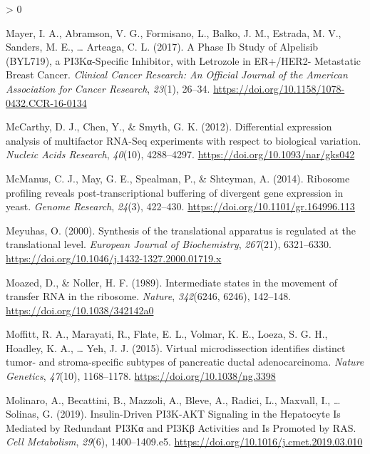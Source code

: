 \documentclass[
  12pt,
  openany]{book}
\newlength{\cslhangindent}
\newenvironment{CSLReferences}[2] %
 {%
  \setlength{\parindent}{0pt}
  \ifodd #1 \everypar{\setlength{\hangindent}{\cslhangindent}}\ignorespaces\fi
  \ifnum #2 > 0
  \setlength{\parskip}{#2\baselineskip}
  \fi
 }%
 {}
\begin{document}
\begin{CSLReferences}{1}{0}
\leavevmode\hypertarget{ref-Mayer2017}{}%
Mayer, I. A., Abramson, V. G., Formisano, L., Balko, J. M., Estrada, M. V., Sanders, M. E., \ldots{} Arteaga, C. L. (2017). A {Phase Ib Study} of {Alpelisib} ({BYL719}), a {PI3Kα}-{Specific Inhibitor}, with {Letrozole} in {ER}+/{HER2}- {Metastatic Breast Cancer}. \emph{Clinical Cancer Research: An Official Journal of the American Association for Cancer Research}, \emph{23}(1), 26--34. \url{https://doi.org/10.1158/1078-0432.CCR-16-0134}

\leavevmode\hypertarget{ref-McCarthy2012}{}%
McCarthy, D. J., Chen, Y., \& Smyth, G. K. (2012). Differential expression analysis of multifactor {RNA}-{Seq} experiments with respect to biological variation. \emph{Nucleic Acids Research}, \emph{40}(10), 4288--4297. \url{https://doi.org/10.1093/nar/gks042}

\leavevmode\hypertarget{ref-McManus2014}{}%
McManus, C. J., May, G. E., Spealman, P., \& Shteyman, A. (2014). Ribosome profiling reveals post-transcriptional buffering of divergent gene expression in yeast. \emph{Genome Research}, \emph{24}(3), 422--430. \url{https://doi.org/10.1101/gr.164996.113}

\leavevmode\hypertarget{ref-Meyuhas2000}{}%
Meyuhas, O. (2000). Synthesis of the translational apparatus is regulated at the translational level. \emph{European Journal of Biochemistry}, \emph{267}(21), 6321--6330. \url{https://doi.org/10.1046/j.1432-1327.2000.01719.x}

\leavevmode\hypertarget{ref-Moazed1989}{}%
Moazed, D., \& Noller, H. F. (1989). Intermediate states in the movement of transfer {RNA} in the ribosome. \emph{Nature}, \emph{342}(6246, 6246), 142--148. \url{https://doi.org/10.1038/342142a0}

\leavevmode\hypertarget{ref-Moffitt2015}{}%
Moffitt, R. A., Marayati, R., Flate, E. L., Volmar, K. E., Loeza, S. G. H., Hoadley, K. A., \ldots{} Yeh, J. J. (2015). Virtual microdissection identifies distinct tumor- and stroma-specific subtypes of pancreatic ductal adenocarcinoma. \emph{Nature Genetics}, \emph{47}(10), 1168--1178. \url{https://doi.org/10.1038/ng.3398}

\leavevmode\hypertarget{ref-Molinaro2019}{}%
Molinaro, A., Becattini, B., Mazzoli, A., Bleve, A., Radici, L., Maxvall, I., \ldots{} Solinas, G. (2019). Insulin-{Driven PI3K}-{AKT Signaling} in the {Hepatocyte Is Mediated} by {Redundant PI3Kα} and {PI3Kβ Activities} and {Is Promoted} by {RAS}. \emph{Cell Metabolism}, \emph{29}(6), 1400--1409.e5. \url{https://doi.org/10.1016/j.cmet.2019.03.010}


\end{CSLReferences}
\end{document}
